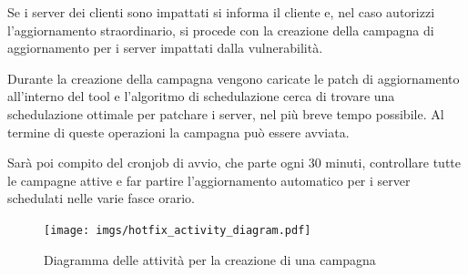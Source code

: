 Se i server dei clienti sono impattati si informa il cliente e, nel caso autorizzi 
l’aggiornamento straordinario, si procede con la creazione della campagna di 
aggiornamento per i server impattati dalla vulnerabilità.

Durante la creazione della campagna vengono caricate le patch di aggiornamento 
all’interno del tool e l’algoritmo di schedulazione cerca di trovare una 
schedulazione ottimale per patchare i server, nel più breve tempo possibile. 
Al termine di queste operazioni la campagna può essere avviata.

Sarà poi compito del cronjob di avvio, che parte ogni 30 minuti, controllare 
tutte le campagne attive e far partire l'aggiornamento automatico per i server 
schedulati nelle varie fasce orario.

\begin{figure}[H]
  \begin{flushright}
    \centering
    \texttt{[image: imgs/hotfix\_activity\_diagram.pdf]}
    \caption{Diagramma delle attività per la creazione di una campagna}
    \label{fig:Diagramma delle attività per la creazione di una campagna}
  \end{flushright}
\end{figure}